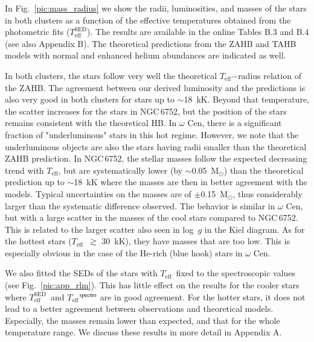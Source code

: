 \documentclass{aa}
\newcommand{\msun}{$\text{M}_\odot$}
\newcommand{\teff}{$T_{\text{eff}}$}
\newcommand{\teffsed}{$T_{\text{eff}}^{\text{SED}}$}
\newcommand{\Cen}{$\omega$ Cen}
\newcommand{\ngc}{NGC\,6752}
\begin{document}
In Fig.~\ref{pic:mass_radius} we show the radii, luminosities, and masses of the stars in both clusters as a function of the effective temperatures obtained from the photometric fits (\teffsed). The results are available in the online Tables B.3 and B.4 (see also Appendix B).
The theoretical predictions from the ZAHB and TAHB models with normal and enhanced helium abundances are indicated as well. 

In both clusters, the stars follow very well the theoretical \teff$-$radius relation of the ZAHB. The agreement between our derived luminosity and the predictions is also very good in both clusters for stars up to $\sim$18~kK. Beyond that temperature, the scatter increases for the stars in \ngc, but the position of the stars remains consistent with the theoretical HB. In \Cen, there is a significant fraction of "underluminous" stars in this hot regime. However, we note that the underluminous objects are also the stars having radii smaller than the theoretical ZAHB prediction. 
In \ngc, the stellar masses follow the expected decreasing trend with \teff, but are systematically lower (by $\sim$0.05~\msun) than the theoretical prediction up to $\sim$18~kK where the masses are then in better agreement with the models. Typical uncertainties on the masses are of $\pm$0.15~\msun, thus considerably larger than the systematic difference observed.
The behavior is similar in \Cen, but with a large scatter in the masses of the cool stars compared to \ngc. This is related to the larger scatter also seen in log~$g$ in the Kiel diagram.
As for the hottest stars (\teff\ $\gtrsim$ 30~kK), they have masses that are too low. This is especially obvious in the case of the He-rich (blue hook) stars in \Cen.

 We also fitted the SEDs of the stars with \teff\ fixed to the spectroscopic values (see Fig.~\ref{pic:app_rlm}). This has little effect on the results for the cooler stars where \teffsed\ and \teff$^{\rm spectro}$ are in good agreement. For the hotter stars, it does not lead to a better agreement between observations and theoretical models. Especially, the masses remain lower than expected, and that for the whole temperature range. We discuss these results in more detail in Appendix A.
\end{document}
